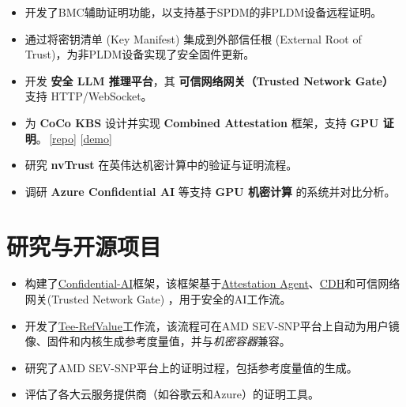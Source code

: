 \documentclass{resume}
\begin{document}
\vspace{-8pt}
\begin{itemize}
  \item 开发了BMC辅助证明功能，以支持基于SPDM的非PLDM设备远程证明。
  \item 通过将密钥清单 (Key Manifest) 集成到外部信任根 (External Root of Trust)，为非PLDM设备实现了安全固件更新。
\end{itemize}

\vspace{-8pt}
\begin{itemize}
    \item 开发 \textbf{安全 LLM 推理平台}，其 \textbf{可信网络网关（Trusted Network Gate）} 支持 HTTP/WebSocket。
    \item 为 \textbf{CoCo KBS} 设计并实现 \textbf{Combined Attestation} 框架，支持 \textbf{GPU 证明}。\,[\href{https://github.com/jingyao-zhang/demo-combined-attestation}{repo}] [\href{https://www.youtube.com/watch?v=PUM6HVjNAm8}{demo}]
    \item 研究 \textbf{nvTrust} 在英伟达机密计算中的验证与证明流程。
    \item 调研 \textbf{Azure Confidential AI} 等支持 \textbf{GPU 机密计算} 的系统并对比分析。
\end{itemize}

\section{研究与开源项目}

\vspace{-8pt}
\begin{itemize}
    \item 构建了\href{https://github.com/inclavare-containers/Confidential-AI}{Confidential-AI}框架，该框架基于\href{https://github.com/confidential-containers/guest-components/tree/main/attestation-agent}{Attestation Agent}、\href{https://github.com/confidential-containers/guest-components/tree/main/confidential-data-hub}{CDH}和可信网络网关(Trusted Network Gate) ，用于安全的AI工作流。
    \item 开发了\href{https://github.com/inclavare-containers/tee-refvalue}{Tee-RefValue}工作流，该流程可在AMD SEV-SNP平台上自动为用户镜像、固件和内核生成参考度量值，并与\textit{机密容器}兼容。
    \item 研究了AMD SEV-SNP平台上的证明过程，包括参考度量值的生成。
    \item 评估了各大云服务提供商（如谷歌云和Azure）的证明工具。
\end{itemize}
\end{document}

